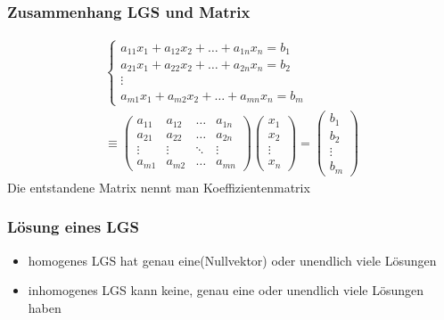\begin{frame}
    \frametitle{Zusammenhang LGS und Matrix}
    \begin{multline}
        \begin{cases}
            a_{11}x_1 + a_{12}x_2 + \dots + a_{1n}x_n = b_1 \\
            a_{21}x_1 + a_{22}x_2 + \dots + a_{2n}x_n = b_2 \\
            \vdots \\
            a_{m1}x_1 + a_{m2}x_2 + \dots + a_{mn}x_n = b_m
        \end{cases}
        \\ \equiv
        \begin{pmatrix}
            a_{11} & a_{12} & \dots  & a_{1n} \\
            a_{21} & a_{22} & \dots  & a_{2n} \\
            \vdots & \vdots & \ddots & \vdots \\
            a_{m1} & a_{m2} & \dots  & a_{mn}
        \end{pmatrix}
        \begin{pmatrix}
            x_1    \\
            x_2    \\
            \vdots \\
            x_n
        \end{pmatrix}
        =
        \begin{pmatrix}
            b_1    \\
            b_2    \\
            \vdots \\
            b_m
        \end{pmatrix}
    \end{multline}
    Die entstandene Matrix nennt man Koeffizientenmatrix
\end{frame}

\begin{frame}
    \frametitle{Lösung eines LGS}
    \begin{itemize}
        \item homogenes LGS hat genau eine(Nullvektor) oder unendlich viele Lösungen
        \item inhomogenes LGS kann keine, genau eine oder unendlich viele Lösungen haben
    \end{itemize}
\end{frame}

